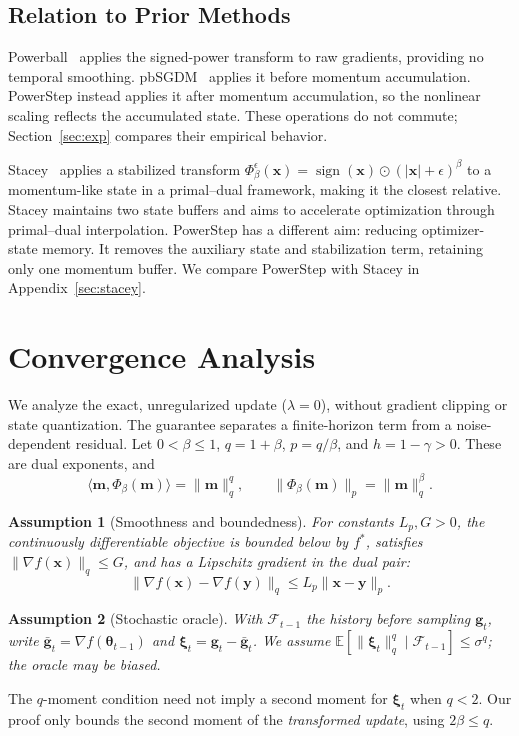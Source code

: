 \documentclass{article}
\newtheorem{assumption}{Assumption}
\begin{document}
\subsection{Relation to Prior Methods}
Powerball~\citep{yuan2019powerball} applies the signed-power transform to raw gradients, providing no temporal smoothing. pbSGDM~\citep{zhou2021pbsgd} applies it before momentum accumulation. PowerStep instead applies it after momentum accumulation, so the nonlinear scaling reflects the accumulated state. These operations do not commute; Section~\ref{sec:exp} compares their empirical behavior.

Stacey~\citep{luo2025stacey} applies a stabilized transform $\Phi_\beta^\epsilon(\mathbf x)=\operatorname{sign}(\mathbf x)\odot(|\mathbf x|+\epsilon)^\beta$ to a momentum-like state in a primal--dual framework, making it the closest relative. Stacey maintains two state buffers and aims to accelerate optimization through primal--dual interpolation. PowerStep has a different aim: reducing optimizer-state memory. It removes the auxiliary state and stabilization term, retaining only one momentum buffer. We compare PowerStep with Stacey in Appendix~\ref{sec:stacey}.


\section{Convergence Analysis}
\label{sec:convergence}
We analyze the exact, unregularized update ($\lambda=0$), without gradient clipping or state quantization. The guarantee separates a finite-horizon term from a noise-dependent residual. Let $0<\beta\le1$, $q=1+\beta$, $p=q/\beta$, and $h=1-\gamma>0$. These are dual exponents, and
\begin{equation}\label{eq:native-identity}
\langle \mathbf{m},\Phi_\beta(\mathbf{m})\rangle=\|\mathbf{m}\|_q^q,
\qquad \|\Phi_\beta(\mathbf{m})\|_p=\|\mathbf{m}\|_q^\beta.
\end{equation}

\begin{assumption}[Smoothness and boundedness]\label{assum:regularity}
For constants $L_p,G>0$, the continuously differentiable objective is bounded below by $f^*$, satisfies $\|\nabla f(\mathbf{x})\|_q\le G$, and has a Lipschitz gradient in the dual pair:
\begin{equation}
\|\nabla f(\mathbf{x})-\nabla f(\mathbf{y})\|_q\le L_p\|\mathbf{x}-\mathbf{y}\|_p.
\end{equation}
\end{assumption}
\begin{assumption}[Stochastic oracle]\label{assum:oracle}
With $\mathcal F_{t-1}$ the history before sampling $\mathbf{g}_t$, write $\bar{\mathbf{g}}_t=\nabla f(\bm{\theta}_{t-1})$ and $\bm{\xi}_t=\mathbf{g}_t-\bar{\mathbf{g}}_t$. We assume $\mathbb E[\|\bm{\xi}_t\|_q^q\mid\mathcal F_{t-1}]\le\sigma^q$; the oracle may be biased.
\end{assumption}
The $q$-moment condition need not imply a second moment for $\bm{\xi}_t$ when $q<2$. Our proof only bounds the second moment of the \emph{transformed update}, using $2\beta\le q$.
\end{document}
